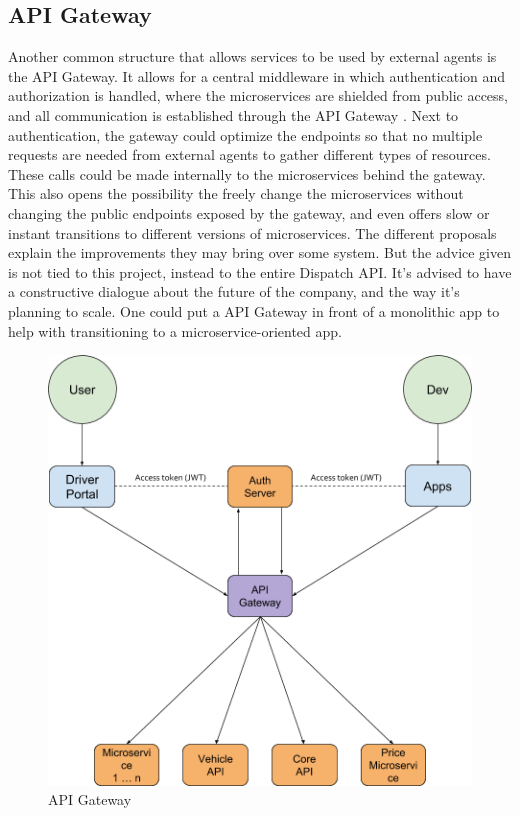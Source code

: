 \subsection{API Gateway}
Another common structure that allows services to be used by external agents is the API Gateway. It allows for a central middleware in which authentication and authorization is handled, where the microservices are shielded from public access, and all communication is established through the API Gateway \cite{api-gateway}. Next to authentication, the gateway could optimize the endpoints so that no multiple requests are needed from external agents to gather different types of resources. These calls could be made internally to the microservices behind the gateway. This also opens the possibility the freely change the microservices without changing the public endpoints exposed by the gateway, and even offers slow or instant transitions to different versions of microservices. The different proposals explain the improvements they may bring over some system. But the advice given is not tied to this project, instead to the entire Dispatch API. It’s advised to have a constructive dialogue about the future of the company, and the way it’s planning to scale. One could put a API Gateway in front of a monolithic app to help with transitioning to a microservice-oriented app.

\begin{figure}[H]
	\centering
	\includegraphics[width=.7\textwidth]{Auth3}
	\caption[API Gateway]{API Gateway}
	\label{fig:Auth3}
\end{figure}

%
